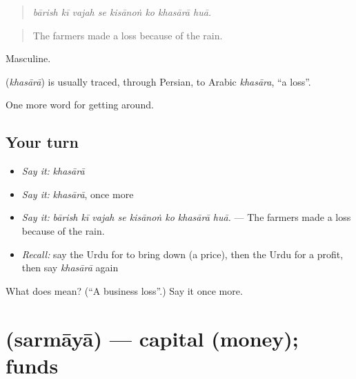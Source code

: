 \begin{quote}
       
\end{quote}

\begin{quote}
\emph{bārish kī vajah se kisānoṅ ko khasārā huā.}
\end{quote}

\begin{quote}
The farmers made a loss because of the rain.
\end{quote}

Masculine.

\begin{cousinweb}
\textbf{} (\emph{khasārā}) is usually traced, through Persian, to Arabic \emph{khasāra}, \textquotedblleft{}a loss\textquotedblright{}.
\end{cousinweb}

\begin{grammarlens}[title={What you've built}]
One more word for getting around.
\end{grammarlens}

\subsection*{Your turn}
\begin{itemize}
\raggedright
  \item \emph{Say it:} \emph{khasārā}
  \item \emph{Say it:} \emph{khasārā}, once more
  \item \emph{Say it:} \emph{bārish kī vajah se kisānoṅ ko khasārā huā.} — The farmers made a loss because of the rain.
  \item \emph{Recall:} say the Urdu for to bring down (a price), then the Urdu for a profit, then say \emph{khasārā} again
\end{itemize}

\begin{tcolorbox}[breakable,colback=teal!4,colframe=teal!35!black,title={Before you move on}]
What does  mean? (\textquotedblleft{}A business loss\textquotedblright{}.) Say it once more.
\end{tcolorbox}
\section[\texorpdfstring{\ur{سرمایہ} (sarmāyā)}{سرمایہ (sarmāyā)}]{ (sarmāyā) — capital (money); funds}


